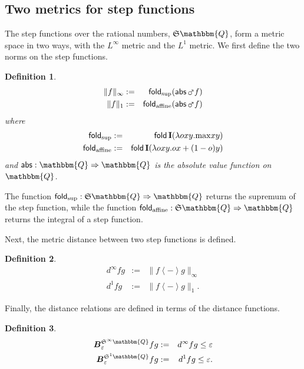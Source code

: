 \documentclass{elsarticle}
\newcommand{\assign}{:=}
\newcommand{\op}[1]{#1}
\newcommand{\tmmathbf}[1]{\ensuremath{\boldsymbol{#1}}}
\newcommand{\tmop}[1]{\ensuremath{\operatorname{#1}}}
\newcommand{\tmstrong}[1]{\textbf{#1}}
\newcommand{\tmtextup}[1]{{\upshape{#1}}}
\newtheorem{definition}{Definition}
\newcommand{\ballsym}{\ensuremath{\tmmathbf{B}}}
\newcommand{\ball}[4]{\ensuremath{\ballsym^{#1}_{#2}  #3  #4}}
\newcommand{\Map}{\ensuremath{\mars}}
\newcommand{\maptwo}[1]{\ensuremath{\left\langle #1 \right\rangle}}
\newcommand{\SF}{\ensuremath{\mathfrak{S}}}
\newcommand{\id}{\text{{\tmstrong{\tmtextup{I}}}}}
\begin{document}
\subsection{Two metrics for step functions}\label{metric-step}The step
functions over the rational numbers, $\SF \mathbbm{Q}$, form a metric space in
two ways, with the $L^{\infty}$ metric
and the $L^1$ metric. We first define the two
norms on the step functions.

\begin{definition}
  \begin{eqnarray*}
    \|f\|_{\infty} & \assign & \tmop{\mathsf{fold}}_{\sup} (
    \tmop{\mathsf{abs}}  \Map f)\\
    \|f\|_1 & \assign & \tmop{\mathsf{fold}}_{\tmop{affine}} (
    \tmop{\mathsf{abs}}  \Map f)
  \end{eqnarray*}
  where
  \begin{eqnarray*}
    \tmop{\mathsf{fold}}_{\sup} & \assign & \tmop{\mathsf{fold}}  \id (\lambda
    o x y. \mathsf{\max} x y)\\
    \tmop{\mathsf{fold}}_{\tmop{affine}} & \assign & \tmop{\mathsf{fold}}  \id
    (\lambda o x y. ox + (1 - o) y)
  \end{eqnarray*}
  and $\tmop{\mathsf{abs}} : \mathbbm{Q} \Rightarrow
  \mathbbm{Q}$ is the absolute value function on $\mathbbm{Q}$.
\end{definition}

The function $\tmop{\mathsf{fold}}_{\sup} : \SF \mathbbm{Q} \Rightarrow
\mathbbm{Q}$ returns the supremum of the step function, while the function
$\tmop{\mathsf{fold}}_{\tmop{affine}} : \SF \mathbbm{Q} \Rightarrow
\mathbbm{Q}$ returns the integral of a step function.

Next, the metric distance between two step functions is defined.

\begin{definition}
  \begin{eqnarray*}
    d^{\infty} f g & \assign & \|f \maptwo{\op{-}} g\|_{\infty}\\
    d^1 f g & \assign & \|f \maptwo{\op{-}} g\|_1 .
  \end{eqnarray*}
\end{definition}

Finally, the distance relations are defined in terms of the distance
functions.

\begin{definition}
  \begin{eqnarray*}
    \ball{\SF^{\infty} \mathbbm{Q}}{\varepsilon}{f}{g} & \assign & d^{\infty}
    f g \leq \varepsilon\\
    \ball{\SF^1 \mathbbm{Q}}{\varepsilon}{f}{g} & \assign & d^1 f g \leq
    \varepsilon .
  \end{eqnarray*}
\end{definition}
\end{document}
